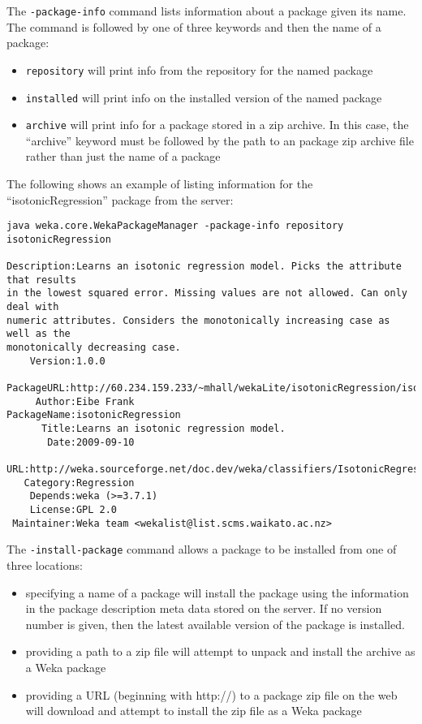 The \texttt{-package-info} command lists information about a package
given its name. The command is followed by one of three keywords and
then the name of a package:

\begin{itemize}
\item \texttt{repository} will print info from the repository for the named package
\item \texttt{installed} will print info on the installed version of the named package
\item \texttt{archive} will print info for a package stored in a zip archive. In this case, the ``archive''
keyword must be followed by the path to an package zip archive file rather than just the name of a package
\end{itemize}

The following shows an example of listing information for the ``isotonicRegression'' package from
the server:

{\scriptsize
\begin{verbatim}
java weka.core.WekaPackageManager -package-info repository isotonicRegression

Description:Learns an isotonic regression model. Picks the attribute that results 
in the lowest squared error. Missing values are not allowed. Can only deal with 
numeric attributes. Considers the monotonically increasing case as well as the 
monotonically decreasing case.
    Version:1.0.0
 PackageURL:http://60.234.159.233/~mhall/wekaLite/isotonicRegression/isotonicRegression1.0.0.zip
     Author:Eibe Frank
PackageName:isotonicRegression
      Title:Learns an isotonic regression model.
       Date:2009-09-10
        URL:http://weka.sourceforge.net/doc.dev/weka/classifiers/IsotonicRegression.html
   Category:Regression
    Depends:weka (>=3.7.1)
    License:GPL 2.0
 Maintainer:Weka team <wekalist@list.scms.waikato.ac.nz>
\end{verbatim}}

The \texttt{-install-package} command allows a package to be installed from one of three
locations:

\begin{itemize}
\item specifying a name of a package will install the package using the
  information in the package description meta data stored on the
  server. If no version number is given, then the latest available
  version of the package is installed.
\item providing a path to a zip file will attempt to unpack and
  install the archive as a Weka package
\item providing a URL (beginning with http://) to a package zip file
  on the web will download and attempt to install the zip file as a
  Weka package
\end{itemize}

